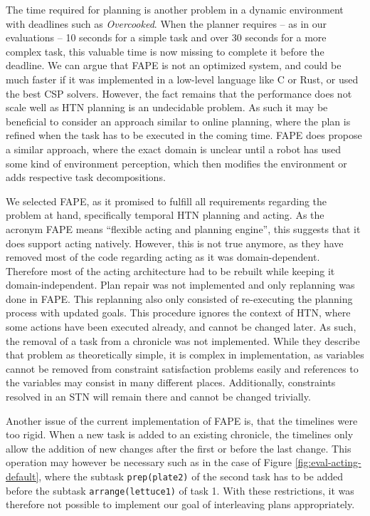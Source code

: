 The time required for planning is another problem in a dynamic environment with deadlines such as \textit{Overcooked}.
When the planner requires -- as in our evaluations -- 10 seconds for a simple task and over 30 seconds for a more complex task, this valuable time is now missing to complete it before the deadline.
We can argue that \ac{FAPE} is not an optimized system, and could be much faster if it was implemented in a low-level language like C or Rust, or used the best \ac{CSP} solvers.
However, the fact remains that the performance does not scale well as \ac{HTN} planning is an undecidable problem.
As such it may be beneficial to consider an approach similar to online planning, where the plan is refined when the task has to be executed in the coming time.
\ac{FAPE} does propose a similar approach, where the exact domain is unclear until a robot has used some kind of environment perception, which then modifies the environment or adds respective task decompositions.

We selected \ac{FAPE}, as it promised to fulfill all requirements regarding the problem at hand, specifically temporal \ac{HTN} planning and acting.
As the acronym \ac{FAPE} means ``flexible acting and planning engine'', this suggests that it does support acting natively.
However, this is not true anymore, as they have removed most of the code regarding acting as it was domain-dependent.
Therefore most of the acting architecture had to be rebuilt while keeping it domain-independent.
Plan repair was not implemented and only replanning was done in \ac{FAPE}.
This replanning also only consisted of re-executing the planning process with updated goals.
This procedure ignores the context of \ac{HTN}, where some actions have been executed already, and cannot be changed later.
As such, the removal of a task from a chronicle was not implemented.
While they describe that problem as theoretically simple, it is complex in implementation, as variables cannot be removed from constraint satisfaction problems easily and references to the variables may consist in many different places.
Additionally, constraints resolved in an \ac{STN} will remain there and cannot be changed trivially.

Another issue of the current implementation of \ac{FAPE} is, that the timelines were too rigid.
When a new task is added to an existing chronicle, the timelines only allow the addition of new changes after the first or before the last change.
This operation may however be necessary such as in the case of Figure \ref{fig:eval-acting-default}, where the subtask \verb|prep(plate2)| of the second task has to be added before the subtask \verb|arrange(lettuce1)| of task 1.
With these restrictions, it was therefore not possible to implement our goal of interleaving plans appropriately.


